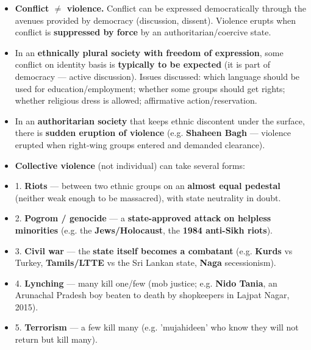 \begin{KeyConcept}
\begin{itemize}
\item \textbf{Conflict $\neq$ violence.} Conflict can be expressed democratically through the avenues provided by democracy (discussion, dissent). Violence erupts when conflict is \textbf{suppressed by force} by an authoritarian/coercive state.
\item In an \textbf{ethnically plural society with freedom of expression}, some conflict on identity basis is \textbf{typically to be expected} (it is part of democracy --- active discussion). Issues discussed: which language should be used for education/employment; whether some groups should get rights; whether religious dress is allowed; affirmative action/reservation.
\item In an \textbf{authoritarian society} that keeps ethnic discontent under the surface, there is \textbf{sudden eruption of violence} (e.g. \textbf{Shaheen Bagh} --- violence erupted when right-wing groups entered and demanded clearance).
\end{itemize}
\end{KeyConcept}

\begin{KeyConcept}
\begin{itemize}
\item \textbf{Collective violence} (not individual) can take several forms:
\item 1. \textbf{Riots} --- between two ethnic groups on an \textbf{almost equal pedestal} (neither weak enough to be massacred), with state neutrality in doubt.
\item 2. \textbf{Pogrom / genocide} --- a \textbf{state-approved attack on helpless minorities} (e.g. the \textbf{Jews/Holocaust}, the \textbf{1984 anti-Sikh riots}).
\item 3. \textbf{Civil war} --- the \textbf{state itself becomes a combatant} (e.g. \textbf{Kurds} vs Turkey, \textbf{Tamils/LTTE} vs the Sri Lankan state, \textbf{Naga} secessionism).
\item 4. \textbf{Lynching} --- many kill one/few (mob justice; e.g. \textbf{Nido Tania}, an Arunachal Pradesh boy beaten to death by shopkeepers in Lajpat Nagar, 2015).
\item 5. \textbf{Terrorism} --- a few kill many (e.g. 'mujahideen' who know they will not return but kill many).
\end{itemize}
\end{KeyConcept}

